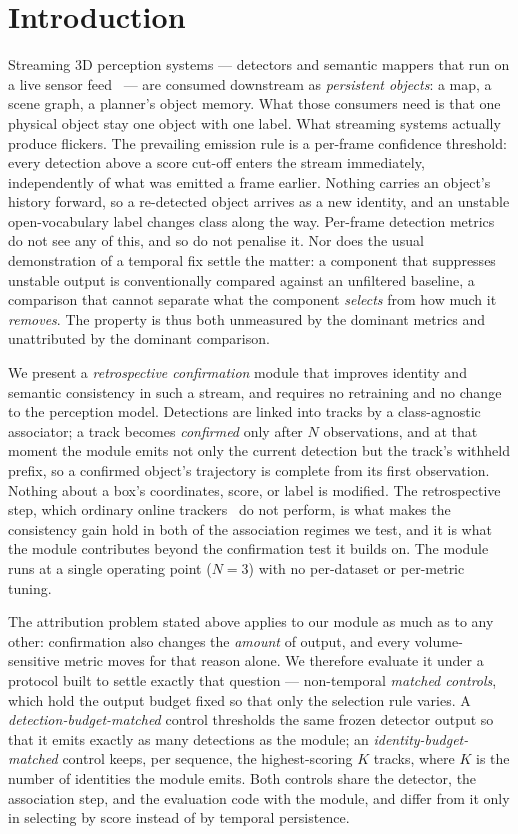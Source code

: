 \section{Introduction}
\label{sec:intro}

Streaming 3D perception systems --- detectors and semantic mappers that run on
a live sensor feed~\cite{streamingperception,streaming3d,conceptfusion,conceptgraphs}
--- are consumed downstream as \emph{persistent objects}: a map, a scene
graph, a planner's object memory. What those consumers need is that one
physical object stay one object with one label. What streaming systems
actually produce flickers. The prevailing emission rule is a per-frame
confidence threshold: every detection above a score cut-off enters the stream
immediately, independently of what was emitted a frame earlier. Nothing
carries an object's history forward, so a re-detected object arrives as a new
identity, and an unstable open-vocabulary label changes class along the way.
Per-frame detection
metrics do not see any of this, and so do not penalise it. Nor does the usual
demonstration of a temporal fix settle the matter: a component that suppresses
unstable output is conventionally compared against an unfiltered baseline, a
comparison that cannot separate what the component \emph{selects} from how
much it \emph{removes}. The property is thus both unmeasured by the dominant
metrics and unattributed by the dominant comparison.

We present a \emph{retrospective confirmation} module that improves identity
and semantic consistency in such a stream, and requires no retraining and no
change to the perception model. Detections are linked into tracks by a
class-agnostic associator; a track becomes \emph{confirmed} only after $N$
observations, and at that moment the module emits not only the current
detection but the track's withheld prefix, so a confirmed object's trajectory
is complete from its first observation. Nothing about a box's
coordinates, score, or label is modified. The retrospective step, which
ordinary online trackers~\cite{sort,deepsort,ab3dmot} do not perform, is what
makes the consistency gain hold in both of the association regimes we test,
and it is what the module contributes beyond the confirmation test it builds
on. The module runs at a single operating point ($N{=}3$) with no per-dataset
or per-metric tuning.

The attribution problem stated above applies to our module as much as to any
other: confirmation also changes the \emph{amount} of output, and every
volume-sensitive metric moves for that reason alone. We therefore evaluate it
under a protocol built to settle exactly that question --- non-temporal
\emph{matched controls}, which hold the output budget fixed so that only the
selection rule varies. A
\emph{detection-budget-matched} control thresholds the same frozen detector
output so that it emits exactly as many detections as the module; an
\emph{identity-budget-matched} control keeps, per sequence, the highest-scoring
$K$ tracks, where $K$ is the number of identities the module emits. Both
controls share the detector, the association step, and the evaluation code
with the module, and differ from it only in selecting by score instead of by
temporal persistence.

